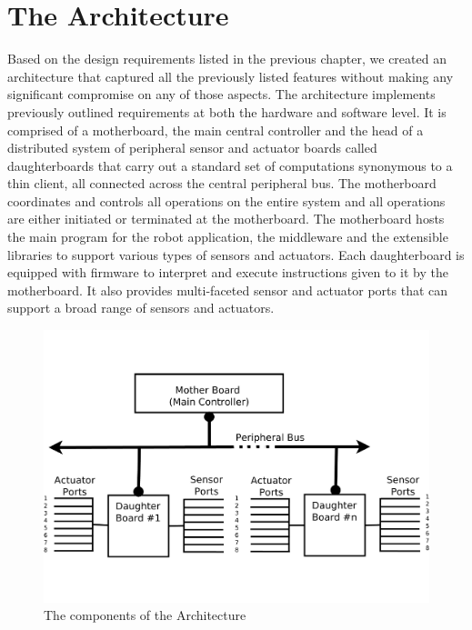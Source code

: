 \section{The Architecture} %
\label{sec:the_architecture}
Based on the design requirements listed in the previous chapter, we created an architecture that captured all the previously listed features without making any significant compromise on any of those aspects. The \xten architecture implements previously outlined requirements at both the hardware and software level. It is comprised of a motherboard, the main central controller and the head of a distributed system of peripheral sensor and actuator boards called daughterboards that carry out a standard set of computations synonymous to a thin client, all connected across the central peripheral bus. The motherboard coordinates and controls all operations on the entire system and all operations are either initiated or terminated at the motherboard. The motherboard hosts the main program for the robot application, the middleware and the extensible libraries to support various types of sensors and actuators. Each daughterboard is equipped with firmware to interpret and execute instructions given to it by the motherboard. It also provides multi-faceted sensor and actuator ports that can support a broad range of sensors and actuators. 

\begin{figure}[h]
  \begin{center}
    \includegraphics[width=1.0\columnwidth]{Figures/system_block_diagram.pdf}
    \caption{The components of the \xten Architecture}
  \end{center}
\end{figure}

